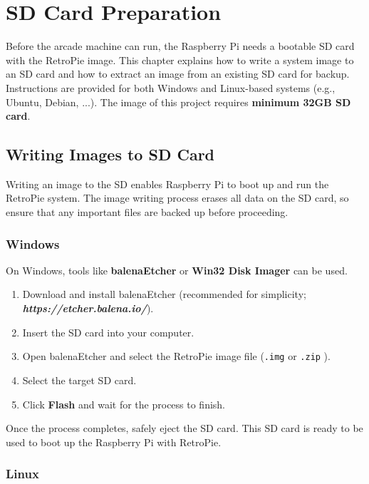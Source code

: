 \chapter{SD Card Preparation}
\label{cha:sd_card_preparation}

Before the arcade machine can run, the Raspberry Pi needs a bootable SD card with the RetroPie image. This chapter explains how to write a system image to an SD card and how to extract an image from an existing SD card for backup. Instructions are provided for both Windows and Linux-based systems (e.g., Ubuntu, Debian, ...). The image of this project requires \textbf{ minimum 32GB SD card}.


\section{Writing Images to SD Card}
\label{sec:writing_images_sd_card}

Writing an image to the SD enables Raspberry Pi to boot up and run the RetroPie system. The image writing process erases all data on the SD card, so ensure that any important files are backed up before proceeding.

\subsection{Windows}
\label{subsec:writing_windows}

On Windows, tools like \textbf{balenaEtcher} or \textbf{Win32 Disk Imager} can be used.
\begin{enumerate}
  \item Download and install balenaEtcher (recommended for simplicity; \textit{\textbf{https://etcher.balena.io/}}).
  \item Insert the SD card into your computer.
  \item Open balenaEtcher and select the RetroPie image file (\texttt{.img} or \texttt{.zip} ).
  \item Select the target SD card.
  \item Click \textbf{Flash} and wait for the process to finish.
\end{enumerate}

Once the process completes, safely eject the SD card. This SD card is ready to be used to boot up the Raspberry Pi with RetroPie.

\subsection{Linux}
\label{subsec:writing_linux}

